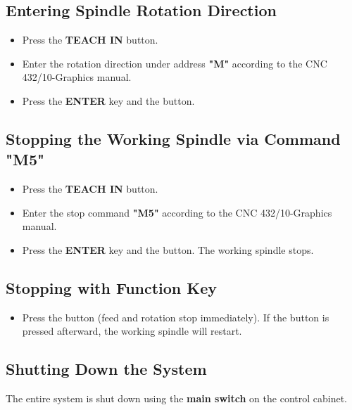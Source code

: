 \subsection{Entering Spindle Rotation Direction}
\begin{itemize}
    \item Press the \textbf{TEACH IN} button.
    \item Enter the rotation direction under address \textbf{"M"} according to the CNC 432/10-Graphics manual.
    \item Press the \textbf{ENTER} key and the  button.
\end{itemize}


\subsection{Stopping the Working Spindle via Command \textbf{"M5"}}
\begin{itemize}
    \item Press the \textbf{TEACH IN} button.
    \item Enter the stop command \textbf{"M5"} according to the CNC 432/10-Graphics manual.
    \item Press the \textbf{ENTER} key and the  button. The working spindle stops.
\end{itemize}

\newpage

\subsection{Stopping with Function Key}

\begin{itemize}
    \item Press the  button (feed and rotation stop immediately). If the  button is pressed afterward, the working spindle will restart.
\end{itemize}

\subsection{Shutting Down the System}
The entire system is shut down using the \textbf{main switch} on the control cabinet.

